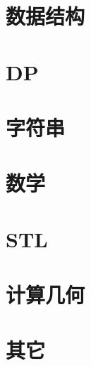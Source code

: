 \section{数据结构}


\section{DP}


\section{字符串}


\section{数学}


\section{STL}


\section{计算几何}


\section{其它}
